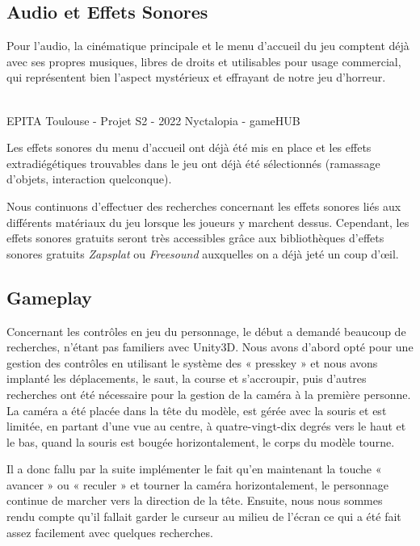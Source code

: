 \subsection{Audio et Effets Sonores}
\setlength{\parindent}{5ex}
Pour l’audio, la cinématique principale et le menu d’accueil du jeu comptent déjà avec ses propres musiques, libres de droits et utilisables pour usage commercial, qui représentent bien l’aspect mystérieux et effrayant de notre jeu d’horreur.

\vfill
\noindent\makebox[\linewidth]{\rule{.8\paperwidth}{.6pt}}\\[0.2cm]
EPITA Toulouse - Projet S2 - 2022 \hfill Nyctalopia - gameHUB
\noindent\makebox[\linewidth]{\rule{.8\paperwidth}{.6pt}}

\newpage

Les effets sonores du menu d’accueil ont déjà été mis en place et les effets extradiégétiques trouvables dans le jeu ont déjà été sélectionnés (ramassage d’objets, interaction quelconque).

Nous continuons d’effectuer des recherches concernant les effets sonores liés aux différents matériaux du jeu lorsque les joueurs y marchent dessus. Cependant, les effets sonores gratuits seront très accessibles grâce aux bibliothèques d’effets sonores gratuits \emph{Zapsplat} ou \emph{Freesound} auxquelles on a déjà jeté un coup d’œil. 


\subsection{Gameplay}
\setlength{\parindent}{5ex}
Concernant les contrôles en jeu du personnage, le début a demandé beaucoup de recherches, n’étant pas familiers avec Unity3D. Nous avons d’abord opté pour une gestion des contrôles en utilisant le système des « presskey » et nous avons implanté les déplacements, le saut, la course et s'accroupir, puis d’autres recherches ont été nécessaire pour la gestion de la caméra à la première personne. La caméra a été placée dans la tête du modèle, est gérée avec la souris et est limitée, en partant d’une vue au centre, à quatre-vingt-dix degrés vers le haut et le bas, quand la souris est bougée horizontalement, le corps du modèle tourne.

Il a donc fallu par la suite implémenter le fait qu'en maintenant la touche « avancer » ou « reculer » et tourner la caméra horizontalement, le personnage continue de marcher vers la direction de la tête. Ensuite, nous nous sommes rendu compte qu’il fallait garder le curseur au milieu de l’écran ce qui a été fait assez facilement avec quelques recherches.

